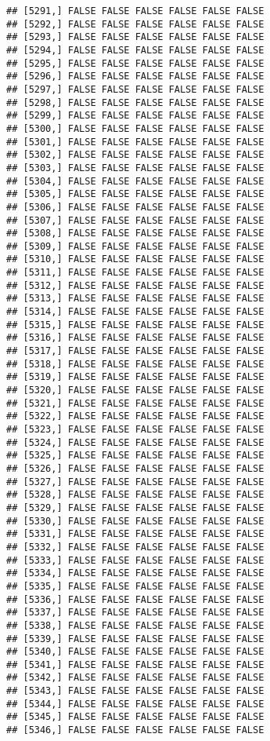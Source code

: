 \documentclass[
]{article}
\begin{document}
\begin{verbatim}
## [5291,] FALSE FALSE FALSE FALSE FALSE FALSE
## [5292,] FALSE FALSE FALSE FALSE FALSE FALSE
## [5293,] FALSE FALSE FALSE FALSE FALSE FALSE
## [5294,] FALSE FALSE FALSE FALSE FALSE FALSE
## [5295,] FALSE FALSE FALSE FALSE FALSE FALSE
## [5296,] FALSE FALSE FALSE FALSE FALSE FALSE
## [5297,] FALSE FALSE FALSE FALSE FALSE FALSE
## [5298,] FALSE FALSE FALSE FALSE FALSE FALSE
## [5299,] FALSE FALSE FALSE FALSE FALSE FALSE
## [5300,] FALSE FALSE FALSE FALSE FALSE FALSE
## [5301,] FALSE FALSE FALSE FALSE FALSE FALSE
## [5302,] FALSE FALSE FALSE FALSE FALSE FALSE
## [5303,] FALSE FALSE FALSE FALSE FALSE FALSE
## [5304,] FALSE FALSE FALSE FALSE FALSE FALSE
## [5305,] FALSE FALSE FALSE FALSE FALSE FALSE
## [5306,] FALSE FALSE FALSE FALSE FALSE FALSE
## [5307,] FALSE FALSE FALSE FALSE FALSE FALSE
## [5308,] FALSE FALSE FALSE FALSE FALSE FALSE
## [5309,] FALSE FALSE FALSE FALSE FALSE FALSE
## [5310,] FALSE FALSE FALSE FALSE FALSE FALSE
## [5311,] FALSE FALSE FALSE FALSE FALSE FALSE
## [5312,] FALSE FALSE FALSE FALSE FALSE FALSE
## [5313,] FALSE FALSE FALSE FALSE FALSE FALSE
## [5314,] FALSE FALSE FALSE FALSE FALSE FALSE
## [5315,] FALSE FALSE FALSE FALSE FALSE FALSE
## [5316,] FALSE FALSE FALSE FALSE FALSE FALSE
## [5317,] FALSE FALSE FALSE FALSE FALSE FALSE
## [5318,] FALSE FALSE FALSE FALSE FALSE FALSE
## [5319,] FALSE FALSE FALSE FALSE FALSE FALSE
## [5320,] FALSE FALSE FALSE FALSE FALSE FALSE
## [5321,] FALSE FALSE FALSE FALSE FALSE FALSE
## [5322,] FALSE FALSE FALSE FALSE FALSE FALSE
## [5323,] FALSE FALSE FALSE FALSE FALSE FALSE
## [5324,] FALSE FALSE FALSE FALSE FALSE FALSE
## [5325,] FALSE FALSE FALSE FALSE FALSE FALSE
## [5326,] FALSE FALSE FALSE FALSE FALSE FALSE
## [5327,] FALSE FALSE FALSE FALSE FALSE FALSE
## [5328,] FALSE FALSE FALSE FALSE FALSE FALSE
## [5329,] FALSE FALSE FALSE FALSE FALSE FALSE
## [5330,] FALSE FALSE FALSE FALSE FALSE FALSE
## [5331,] FALSE FALSE FALSE FALSE FALSE FALSE
## [5332,] FALSE FALSE FALSE FALSE FALSE FALSE
## [5333,] FALSE FALSE FALSE FALSE FALSE FALSE
## [5334,] FALSE FALSE FALSE FALSE FALSE FALSE
## [5335,] FALSE FALSE FALSE FALSE FALSE FALSE
## [5336,] FALSE FALSE FALSE FALSE FALSE FALSE
## [5337,] FALSE FALSE FALSE FALSE FALSE FALSE
## [5338,] FALSE FALSE FALSE FALSE FALSE FALSE
## [5339,] FALSE FALSE FALSE FALSE FALSE FALSE
## [5340,] FALSE FALSE FALSE FALSE FALSE FALSE
## [5341,] FALSE FALSE FALSE FALSE FALSE FALSE
## [5342,] FALSE FALSE FALSE FALSE FALSE FALSE
## [5343,] FALSE FALSE FALSE FALSE FALSE FALSE
## [5344,] FALSE FALSE FALSE FALSE FALSE FALSE
## [5345,] FALSE FALSE FALSE FALSE FALSE FALSE
## [5346,] FALSE FALSE FALSE FALSE FALSE FALSE

\end{verbatim}
\end{document}

